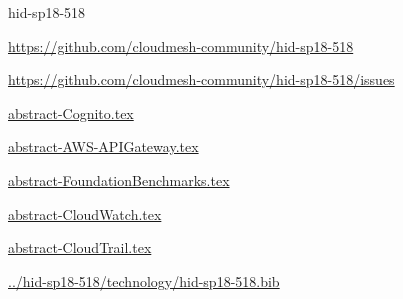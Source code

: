 \begin{IU}

hid-sp18-518

\url{https://github.com/cloudmesh-community/hid-sp18-518}

\url{https://github.com/cloudmesh-community/hid-sp18-518/issues}

\href{https://github.com/cloudmesh-community/hid-sp18-518/blob/master//technology/abstract-Cognito.tex}{abstract-Cognito.tex}

\href{https://github.com/cloudmesh-community/hid-sp18-518/blob/master//technology/abstract-AWS-APIGateway.tex}{abstract-AWS-APIGateway.tex}

\href{https://github.com/cloudmesh-community/hid-sp18-518/blob/master//technology/abstract-FoundationBenchmarks.tex}{abstract-FoundationBenchmarks.tex}

\href{https://github.com/cloudmesh-community/hid-sp18-518/blob/master//technology/abstract-CloudWatch.tex}{abstract-CloudWatch.tex}

\href{https://github.com/cloudmesh-community/hid-sp18-518/blob/master//technology/abstract-CloudTrail.tex}{abstract-CloudTrail.tex}

\href{https://github.com/cloudmesh-community/hid-sp18-518/blob/master//technology/hid-sp18-518.bib}{../hid-sp18-518/technology/hid-sp18-518.bib}

\end{IU}


